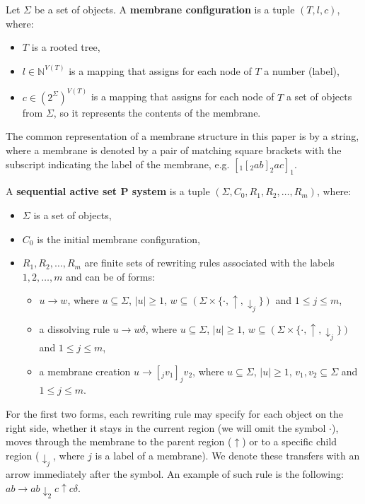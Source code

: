 Let $\Sigma$ be a set of objects. A {\bf membrane configuration} is a tuple $(T, l, c)$, where:
\begin{itemize}
  \item $T$ is a rooted tree,
  \item $l\in\mathbb N^{V(T)}$ is a mapping that assigns for each node of $T$ a number (label),
  \item $c\in(2^\Sigma)^{V(T)}$ is a mapping that assigns for each node of $T$ a set of objects from $\Sigma$, so it represents the contents of the membrane.
\end{itemize}

The common representation of a membrane structure in this paper is by a string, where a membrane is denoted by a pair of matching square brackets with the subscript indicating the label of the membrane, e.g. $[_1 [_2 ab ]_2 ac ]_1$.

A {\bf sequential active set P system} is a tuple $(\Sigma, C_0, R_1, R_2, \dots , R_m)$, where:
\begin{itemize}
  \item $\Sigma$ is a set of objects,
  \item $C_0$ is the initial membrane configuration,
  \item $R_1,R_2,\dots, R_m$ are finite sets of rewriting rules associated with the labels $1,2,\dots,m$ and can be of forms:
  \begin{itemize}
    \item $u\rightarrow w$, where $u\subseteq \Sigma$, $|u|\geq 1$, $w\subseteq (\Sigma\times\{\cdot, \uparrow, \downarrow_j\})$ and $1\leq j\leq m$,
    \item a dissolving rule $u\rightarrow w\delta$, where $u\subseteq \Sigma$, $|u|\geq 1$, $w\subseteq (\Sigma\times\{\cdot, \uparrow, \downarrow_j\})$ and $1\leq j\leq m$,
    \item a membrane creation $u\rightarrow [_j v_1]_j v_2$, where $u\subseteq \Sigma$, $|u|\geq 1$, $v_1, v_2\subseteq \Sigma$ and $1\leq j\leq m$.
  \end{itemize}
\end{itemize}

For the first two forms, each rewriting rule may specify for each object on the right side, whether it stays in the current region (we will omit the symbol $\cdot$), moves through the membrane to the parent region ($\uparrow$)
or to a specific child region ($\downarrow_j$, where $j$ is a label of a membrane).
We denote these transfers with an arrow immediately after the symbol.
An example of such rule is the following: $ab\rightarrow ab\downarrow_2 c\uparrow c\delta$.

